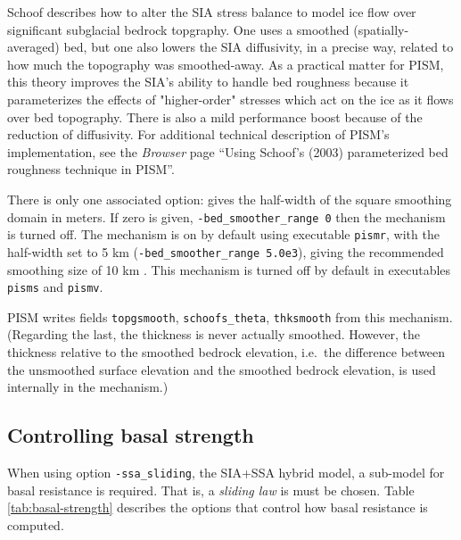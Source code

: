 Schoof \cite{Schoofbasaltopg2003} describes how to alter the SIA stress balance to model ice flow over significant subglacial bedrock topgraphy.  One uses a smoothed (spatially-averaged) bed, but one also lowers the SIA diffusivity, in a precise way, related to how much the topography was smoothed-away.  As a practical matter for PISM, this theory improves the SIA's ability to handle bed roughness because it parameterizes the effects of "higher-order" stresses which act on the ice as it flows over bed topography.  There is also a mild performance boost because of the reduction of diffusivity.  For additional technical description of PISM's implementation, see the \emph{Browser} page ``Using Schoof's (2003) parameterized bed roughness technique in PISM''.

There is only one associated option:  gives the half-width of the square smoothing domain in meters.  If zero is given, \texttt{-bed_smoother_range 0} then the mechanism is turned off.  The mechanism is on by default using executable \texttt{pismr}, with the half-width set to 5 km (\texttt{-bed_smoother_range 5.0e3}), giving the recommended smoothing size of 10 km \cite{Schoofbasaltopg2003}.  This mechanism is turned off by default in executables \texttt{pisms} and \texttt{pismv}.

PISM writes fields \texttt{topgsmooth}, \texttt{schoofs_theta}, \texttt{thksmooth} from this mechanism.  (Regarding the last, the thickness is never actually smoothed.  However, the thickness relative to the smoothed bedrock elevation, i.e.~the difference between the unsmoothed surface elevation and the smoothed bedrock elevation, is used internally in the mechanism.)


\subsection{Controlling basal strength}  \label{subsect:basestrength}

When using option \texttt{-ssa_sliding}, the SIA+SSA hybrid model, a sub-model for basal resistance is required.  That is, a \emph{sliding law} is must be chosen.  Table \ref{tab:basal-strength} describes the options that control how basal resistance is computed.

